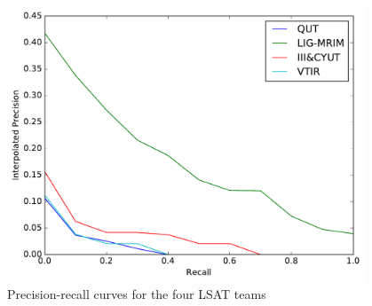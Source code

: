 \begin{figure}[hb]
    \centering
    \includegraphics[width=0.95\textwidth]{graphs/ntcir-pr-curve}
    \caption{Precision-recall curves for the four LSAT teams}
    \label{fig:ntcir-results}
\end{figure}